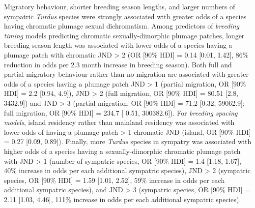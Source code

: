 \documentclass[
  a4paper,
]{article}
\begin{document}
Migratory behaviour, shorter breeding season lengths, and larger numbers
of sympatric \emph{Turdus} species were strongly associated with greater
odds of a species having chromatic plumage sexual dichromatism. Among
predictors of \emph{breeding timing} models predicting chromatic
sexually-dimorphic plumage patches, longer breeding season length was
associated with lower odds of a species having a plumage patch with
chromatic JND \textgreater{} 2 (OR {[}90\% HDI{]} = 0.14 {[}0.01,
1.42{]}, 86\% reduction in odds per 2.3 month increase in breeding
season). Both full and partial migratory behaviour rather than no
migration are associated with greater odds of a species having a plumage
patch JND \textgreater{} 1 (partial migration, OR {[}90\% HDI{]} = 2.2
{[}0.94, 4.9{]}), JND \textgreater{} 2 (full migration, OR {[}90\%
HDI{]} = 80.51 {[}2.8, 3432.9{]}) and JND \textgreater{} 3 (partial
migration, OR {[}90\% HDI{]} = 71.2 {[}0.32, 59062.9{]}; full migration,
OR {[}90\% HDI{]} = 234.7 {[} 0.51, 300382.6{]}). For \emph{breeding
spacing models}, island residency rather than mainland residency was
associated with lower odds of having a plumage patch \textgreater{} 1
chromatic JND (island, OR {[}90\% HDI{]} = 0.27 {[}0.09, 0.89{]}).
Finally, more \emph{Turdus} species in sympatry was associated with
higher odds of a species having a sexually-dimorphic chromatic plumage
patch with JND \textgreater{} 1 (number of sympatric species, OR {[}90\%
HDI{]} = 1.4 {[}1.18, 1.67{]}, 40\% increase in odds per each additional
sympatric species), JND \textgreater{} 2 (sympatric species, OR {[}90\%
HDI{]} = 1.59 {[}1.01, 2.52{]}, 59\% increase in odds per each
additional sympatric species), and JND \textgreater{} 3 (sympatric
species, OR {[}90\% HDI{]} = 2.11 {[}1.03, 4.46{]}, 111\% increase in
odds per each additional sympatric species).
\end{document}
